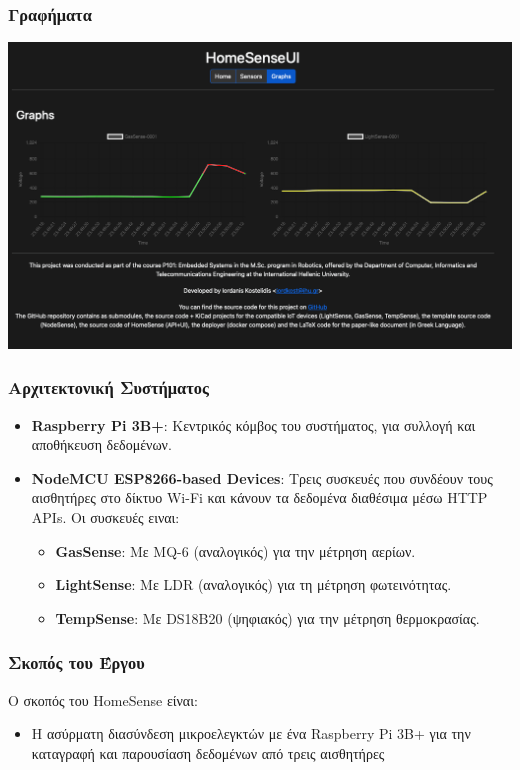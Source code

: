 \documentclass{beamer}
\begin{document}
\begin{frame}
\frametitle{Γραφήματα}
	\centerline{\includegraphics[width=1\textwidth]{assets/graphs-html}}
\end{frame}

\begin{frame}
\frametitle{Αρχιτεκτονική Συστήματος}
\begin{itemize}
    \item \textbf{Raspberry Pi 3B+}: Κεντρικός κόμβος του συστήματος, για συλλογή και αποθήκευση δεδομένων.
    \item \textbf{NodeMCU ESP8266-based Devices}: Τρεις συσκευές που συνδέουν τους αισθητήρες στο δίκτυο Wi-Fi και κάνουν τα δεδομένα διαθέσιμα μέσω HTTP APIs. Οι συσκευές ειναι:
    \begin{itemize}
        \item \textbf{GasSense}: Με MQ-6 (αναλογικός) για την μέτρηση αερίων.
        \item \textbf{LightSense}: Με LDR (αναλογικός) για τη μέτρηση φωτεινότητας.
        \item \textbf{TempSense}: Με DS18B20 (ψηφιακός) για την μέτρηση θερμοκρασίας.
    \end{itemize}
\end{itemize}
\end{frame}

\begin{frame}
\frametitle{Σκοπός του Έργου}
Ο σκοπός του HomeSense είναι:
\begin{itemize}
    \item Η ασύρματη διασύνδεση μικροελεγκτών με ένα Raspberry Pi 3B+ για την καταγραφή και παρουσίαση δεδομένων από τρεις αισθητήρες  
\end{itemize}
\end{frame}
\end{document}
